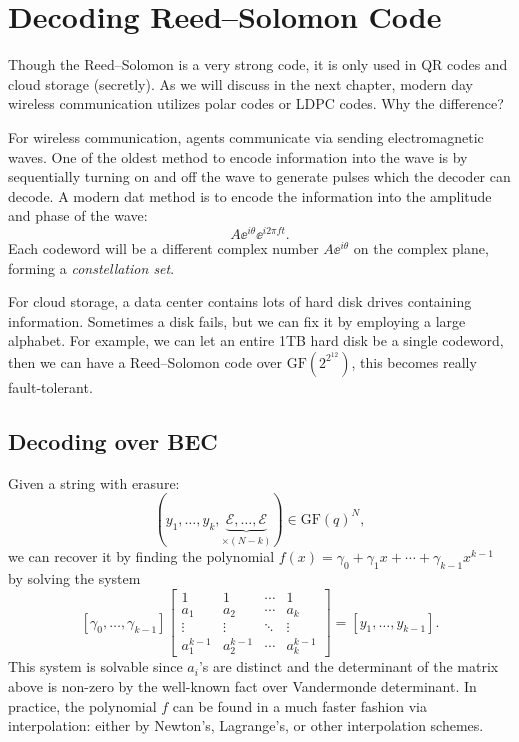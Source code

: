 \section{Decoding Reed--Solomon Code}

Though the Reed--Solomon is a very strong code, it is only used in QR codes and cloud storage (secretly). As we will discuss in the next chapter, modern day wireless communication utilizes polar codes or LDPC codes. Why the difference?

For wireless communication, agents communicate via sending electromagnetic waves. One of the oldest method to encode information into the wave is by sequentially turning on and off the wave to generate pulses which the decoder can decode. A modern dat method is to encode the information into the amplitude and phase of the wave:
\begin{equation*}
    A\ee^{i\theta} \ee^{i2\pi ft}.
\end{equation*}
Each codeword will be a different complex number $A\ee^{i\theta}$ on the complex plane, forming a \textit{constellation set}.

For cloud storage, a data center contains lots of hard disk drives containing information. Sometimes a disk fails, but we can fix it by employing a large alphabet. For example, we can let an entire 1TB hard disk be a single codeword, then we can have a Reed--Solomon code over $\mathrm{GF}(2^{2^{12}})$, this becomes really fault-tolerant.

\subsection{Decoding over BEC}
Given a string with erasure:
\begin{equation*}
    (y_1,\ldots,y_k,\underbrace{\mathcal{E},\ldots,\mathcal{E}}_{\times(N-k)}) \in \mathrm{GF}(q)^N,
\end{equation*}
we can recover it by finding the polynomial $f(x)=\gamma_0 + \gamma_1x+\cdots+\gamma_{k-1}x^{k-1}$ by solving the system
\begin{equation*}
    \left[\gamma_0,\ldots,\gamma_{k-1}\right] \left[\begin{matrix}
        1 & 1 & \cdots & 1 \\
        a_1 & a_2 & \cdots & a_k \\
        \vdots & \vdots & \ddots & \vdots \\
        a_1^{k-1} & a_2^{k-1} & \cdots & a_k^{k-1}
    \end{matrix}\right] = [y_1,\ldots,y_{k-1}].
\end{equation*}
This system is solvable since $a_i$'s are distinct and the determinant of the matrix above is non-zero by the well-known fact over Vandermonde determinant. In practice, the polynomial $f$ can be found in a much faster fashion via interpolation: either by Newton's, Lagrange's, or other interpolation schemes.


